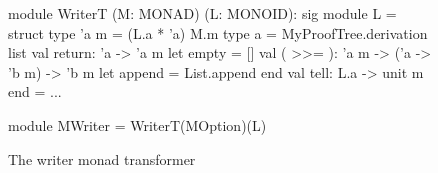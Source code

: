 \documentclass{easychair}
\begin{document}
\begin{figure}
  \centering
\begin{ocaml}
module WriterT (M: MONAD) (L: MONOID): sig      module L = struct
  type 'a m = (L.a * 'a) M.m                      type a = MyProofTree.derivation list
  val return: 'a -> 'a m                          let empty = []
  val ( >>= ): 'a m -> ('a -> 'b m) -> 'b m       let append = List.append
                                                end
  val tell: L.a -> unit m
end = ...

module MWriter = WriterT(MOption)(L)
\end{ocaml}
  \caption{The writer monad transformer}
  \label{fig:writer}
\end{figure}




\end{document}
